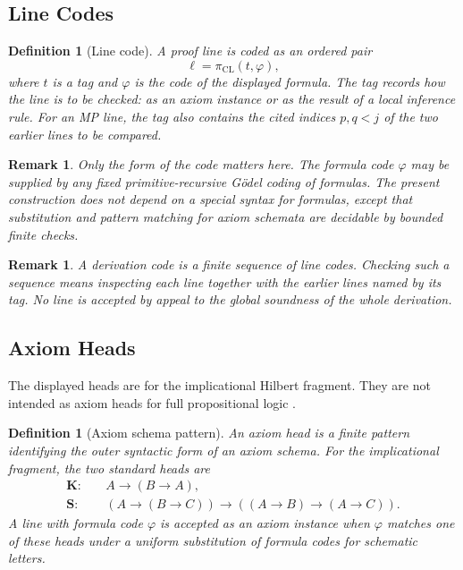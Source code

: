 \documentclass[letterpaper,10pt]{article}
\theoremstyle{upright}
\theoremstyle{upright}
\newtheorem{remark}[theorem]{Remark}
\newtheorem{definition}[theorem]{Definition}
\begin{document}
\subsection{Line Codes}\label{subsec:line-codes}

\begin{definition}[Line code]
	A proof line is coded as an ordered pair
	\begin{equation}
		\ell=\pi_{\mathrm{CL}}(t,\varphi),
	\end{equation}
	where $t$ is a tag and $\varphi$ is the code of the displayed formula. The tag records how the line is to be checked: as an axiom instance or as the result of a local inference rule. For an \textsc{MP} line, the tag also contains the cited indices $p,q<j$ of the two earlier lines to be compared.
\end{definition}

\begin{remark}
	Only the form of the code matters here. The formula code $\varphi$ may be supplied by any fixed primitive-recursive Gödel coding of formulas. The present construction does not depend on a special syntax for formulas, except that substitution and pattern matching for axiom schemata are decidable by bounded finite checks.
\end{remark}

\begin{remark}
	A derivation code is a finite sequence of line codes. Checking such a sequence means inspecting each line together with the earlier lines named by its tag. No line is accepted by appeal to the global soundness of the whole derivation.
\end{remark}

\subsection{Axiom Heads}\label{subsec:axiom-heads}

The displayed heads are for the implicational Hilbert fragment. They are not intended as axiom heads for full propositional logic \citep{hilbert28}.

\begin{definition}[Axiom schema pattern]
	An axiom head is a finite pattern identifying the outer syntactic form of an axiom schema. For the implicational fragment, the two standard heads are
	\begin{align}
		\mathbf{K}:&\quad A\to(B\to A),\\
		\mathbf{S}:&\quad (A\to(B\to C))\to((A\to B)\to(A\to C)).
	\end{align}
	A line with formula code $\varphi$ is accepted as an axiom instance when $\varphi$ matches one of these heads under a uniform substitution of formula codes for schematic letters.
\end{definition}
\end{document}
